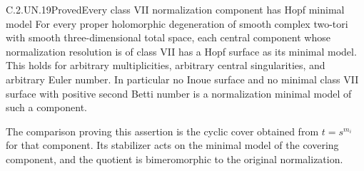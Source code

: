 \begin{statement}{C.2.UN.19}{Proved}{Every class VII normalization component has Hopf minimal model}
For every proper holomorphic degeneration of smooth complex
two-tori with smooth three-dimensional total space, each
central component whose normalization resolution is of class
VII has a Hopf surface as its minimal model. This holds for
arbitrary multiplicities, arbitrary central singularities,
and arbitrary Euler number. In particular no Inoue surface
and no minimal class VII surface with positive second Betti
number is a normalization minimal model of such a component.

The comparison proving this assertion is the cyclic cover
obtained from $t=s^{m_i}$ for that component. Its stabilizer
acts on the minimal model of the covering component, and
the quotient is bimeromorphic to the original normalization.
\end{statement}

